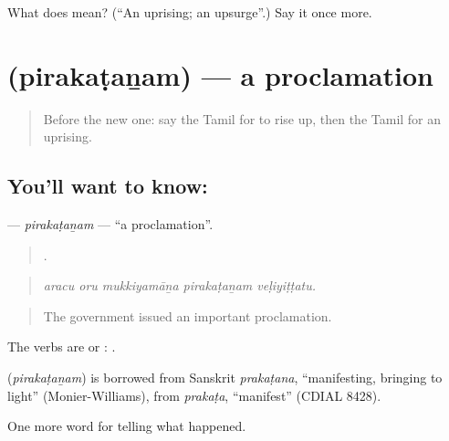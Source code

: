 \begin{tcolorbox}[breakable,colback=teal!4,colframe=teal!35!black,title={Before you move on}]
What does  mean? (\textquotedblleft{}An uprising; an upsurge\textquotedblright{}.) Say it once more.
\end{tcolorbox}
\section[\texorpdfstring{\ta{பிரகடனம்} (pirakaṭaṉam)}{பிரகடனம் (pirakaṭaṉam)}]{ (pirakaṭaṉam) — a proclamation}

\label{lesson:TA-C311-pirakatanam}



\begin{quote}
Before the new one: say the Tamil for to rise up, then the Tamil for an uprising.
\end{quote}

\subsection*{You'll want to know: }
\textbf{} — \emph{pirakaṭaṉam} — \textquotedblleft{}a proclamation\textquotedblright{}.

\begin{quote}
    .
\end{quote}

\begin{quote}
\emph{aracu oru mukkiyamāṉa pirakaṭaṉam veḷiyiṭṭatu.}
\end{quote}

\begin{quote}
The government issued an important proclamation.
\end{quote}

The verbs are  or :  .

\begin{cousinweb}
\textbf{} (\emph{pirakaṭaṉam}) is borrowed from Sanskrit \emph{prakaṭana}, \textquotedblleft{}manifesting, bringing to light\textquotedblright{} (Monier-Williams), from \emph{prakaṭa}, \textquotedblleft{}manifest\textquotedblright{} (CDIAL 8428).
\end{cousinweb}

\begin{grammarlens}[title={What you've built}]
One more word for telling what happened.
\end{grammarlens}

